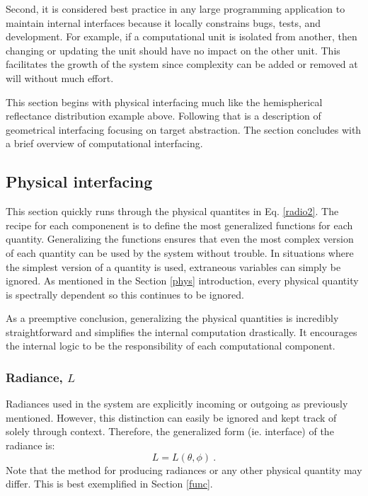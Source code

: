 \documentclass{article}
\numberwithin{equation}{section}
\begin{document}
    Second, it is considered best practice in any large programming application to maintain internal
    interfaces because it locally constrains bugs, tests, and development.
    For example, if a computational unit is isolated from another, then changing or updating the unit should
    have no impact on the other unit.
    This facilitates the growth of the system since complexity can be added or removed at will without much
    effort.

    This section begins with physical interfacing much like the hemispherical reflectance distribution example
    above.
    Following that is a description of geometrical interfacing focusing on target abstraction.
    The section concludes with a brief overview of computational interfacing.
    
    \subsection{Physical interfacing} \label{intfphys}

        This section quickly runs through the physical quantites in Eq. \ref{radio2}.
        The recipe for each componenent is to define the most generalized functions for each quantity.
        Generalizing the functions ensures that even the most complex version of each quantity can be used by the
        system without trouble.
        In situations where the simplest version of a quantity is used, extraneous variables can simply be
        ignored.
        As mentioned in the Section \ref{phys} introduction, every physical quantity is spectrally dependent so
        this continues to be ignored.

        As a preemptive conclusion, generalizing the physical quantities is incredibly straightforward and
        simplifies the internal computation drastically.
        It encourages the internal logic to be the responsibility of each computational component.

        \subsubsection*{Radiance, $L$}

            Radiances used in the system are explicitly incoming or outgoing as previously mentioned.
            However, this distinction can easily be ignored and kept track of solely through context.
            Therefore, the generalized form (ie. interface) of the radiance is:
            $$L = L(\theta, \phi)\ .$$
            Note that the method for producing radiances or any other physical quantity may differ.
            This is best exemplified in Section \ref{func}.
\end{document}
